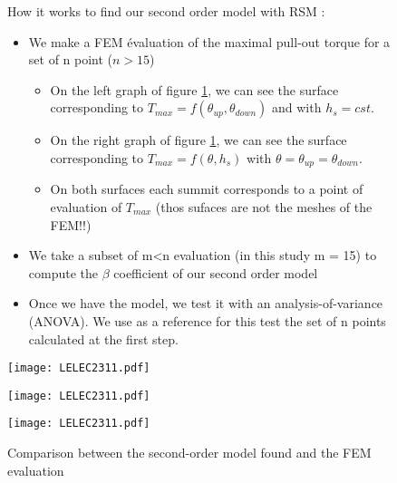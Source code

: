 \begin{figure}[H]
    \begin{minipage}{.45\linewidth}
    How it works to find our second order model with RSM : 
    \begin{itemize}
        \item We make a FEM évaluation of the maximal pull-out torque for a set of n point ($n>15$)
            \begin{itemize}
                \item On the left graph of figure \ref{fig:58_th slide}, we can see the surface corresponding to $T_{max} = f(\theta_{up},\theta_{down})$ and with $h_s = cst$.
                \item On the right graph of figure \ref{fig:58_th slide}, we can see the surface corresponding to $T_{max} = f(\theta, h_s)$ with $\theta  = \theta_{up} = \theta_{down}$.
                \item On both surfaces each summit corresponds to a point of evaluation of $T_{max}$ (thos sufaces are not the meshes of the FEM!!)
            \end{itemize}
        \item We take a subset of m<n evaluation (in this study m = 15) to compute the $\beta$ coefficient of our second order model
        \item Once we have the model, we test it with an analysis-of-variance (ANOVA). We use as a reference for this test the set of n points calculated at the first step.
    \end{itemize}
    \end{minipage}
    \hfill%
    \begin{minipage}[c]{.53\linewidth}
        \centering
        \texttt{[image: LELEC2311.pdf]}
        \caption{}
        \label{fig:58_th slide}
    \end{minipage}
\end{figure}

\begin{figure}[H]
    \begin{minipage}{.48\linewidth}
    \centering
        \texttt{[image: LELEC2311.pdf]}
    \end{minipage}
    \hfill%
    \begin{minipage}[c]{.48\linewidth}
        \centering
        \texttt{[image: LELEC2311.pdf]}
        \label{fig:60_th slide}
    \end{minipage}
    \caption{Comparison between the second-order model found and the FEM evaluation}
\end{figure}


